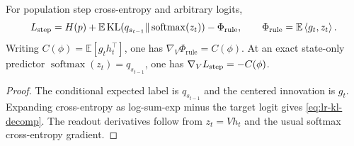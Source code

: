 \begin{lrlemma}
\label{lem:lr-decomposition}
For population step cross-entropy and arbitrary logits,
\begin{equation}\label{eq:lr-kl-decomp}
 L_{\mathrm{step}}=H(p)+\mathbb E\operatorname{KL}
 (q_{s_{t-1}}\Vert\operatorname{softmax}(z_t))
 -\Phi_{\mathrm{rule}},\qquad
 \Phi_{\mathrm{rule}}=\mathbb E\left\langle g_t,z_t\right\rangle.
\end{equation}
Writing $C(\phi)=\mathbb E[g_t h_t^\top]$, one has
$\nabla_V\Phi_{\mathrm{rule}}=C(\phi)$.  At an exact state-only predictor
$\operatorname{softmax}(z_t)=q_{s_{t-1}}$, one has
$\nabla_VL_{\mathrm{step}}=-C(\phi)$.
\end{lrlemma}
\begin{proof}
The conditional expected label is $q_{s_{t-1}}$ and the centered
innovation is $g_t$.  Expanding cross-entropy as log-sum-exp minus the
target logit gives \eqref{eq:lr-kl-decomp}.  The readout derivatives follow
from $z_t=Vh_t$ and the usual softmax cross-entropy gradient.
\end{proof}

